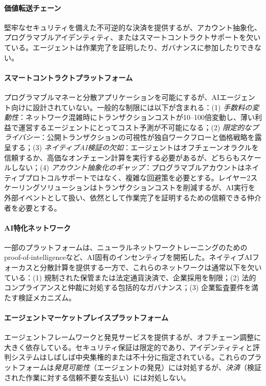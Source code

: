 \documentclass[11pt]{article}
\begin{document}
\paragraph{価値転送チェーン} 堅牢なセキュリティを備えた不可逆的な決済を提供するが、アカウント抽象化、プログラマブルアイデンティティ、またはスマートコントラクトサポートを欠いている。エージェントは作業完了を証明したり、ガバナンスに参加したりできない。

\paragraph{スマートコントラクトプラットフォーム} プログラマブルマネーと分散アプリケーションを可能にするが、AIエージェント向けに設計されていない。一般的な制限には以下が含まれる：(1) \emph{手数料の変動性}：ネットワーク混雑時にトランザクションコストが10--100倍変動し、薄い利益で運営するエージェントにとってコスト予測が不可能になる；(2) \emph{限定的なプライバシー}：公開トランザクションの可視性が独自ワークフローと価格戦略を露呈する；(3) \emph{ネイティブAI検証の欠如}：エージェントはオフチェーンオラクルを信頼するか、高価なオンチェーン計算を実行する必要があるが、どちらもスケールしない；(4) \emph{アカウント抽象化のギャップ}：プログラマブルアカウントはネイティブプロトコルサポートではなく、複雑な回避策を必要とする。レイヤー2スケーリングソリューションはトランザクションコストを削減するが、AI実行を外部イベントとして扱い、依然として作業完了を証明するための信頼できる仲介者を必要とする。

\paragraph{AI特化ネットワーク} 一部のプラットフォームは、ニューラルネットワークトレーニングのためのproof-of-intelligenceなど、AI固有のインセンティブを開拓した。ネイティブAIフォーカスと分散計算を提供する一方で、これらのネットワークは通常以下を欠いている：(1) 規制された保管または法定通貨決済で、企業採用を制限；(2) 法的コンプライアンスと仲裁に対処する包括的なガバナンス；(3) 企業監査要件を満たす検証メカニズム。

\paragraph{エージェントマーケットプレイスプラットフォーム} エージェントフレームワークと発見サービスを提供するが、オフチェーン調整に大きく依存している。セキュリティ保証は限定的であり、アイデンティティと評判システムはしばしば中央集権的または不十分に指定されている。これらのプラットフォームは\emph{発見可能性}（エージェントの発見）には対処するが、\emph{決済}（検証された作業に対する信頼不要な支払い）には対処しない。
\end{document}
